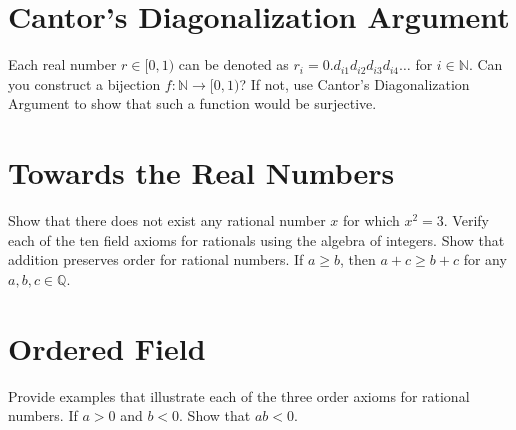 \documentclass[12pt]{exam}
\begin{document}
\section{Cantor's Diagonalization Argument}
\begin{questions}
\question Each real number $r \in [0,1)$ can be denoted as $r_i = 0.d_{i1}d_{i2}d_{i3}d_{i4}\ldots$ for $i \in \mathbb{N}$. Can you construct a bijection $f : \mathbb{N} \to [0,1)$? If not, use Cantor's Diagonalization Argument to show that such a function would be surjective.
\end{questions}
\section{Towards the Real Numbers}
\begin{questions}
    \question Show that there does not exist any rational number $x$ for which $x^2 = 3$.
    \question Verify each of the ten field axioms for rationals using the algebra of integers.
    \question Show that addition preserves order for rational numbers. If $a \geq b$, then $a + c \geq b + c$ for any $a, b, c \in \mathbb{Q}$.

\end{questions}
\section{Ordered Field}
\begin{questions}
    \question Provide examples that illustrate each of the three order axioms for rational numbers.
    \question If $a > 0$ and $b < 0$. Show that $ab < 0$.
\end{questions}
\end{document}
